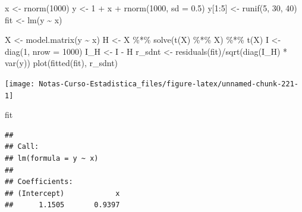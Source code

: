 \documentclass[
  12pt,
]{book}
\newenvironment{Shaded}{\begin{snugshade}}{\end{snugshade}}
\newcommand{\AttributeTok}[1]{\textcolor[rgb]{0.77,0.63,0.00}{#1}}
\newcommand{\DecValTok}[1]{\textcolor[rgb]{0.00,0.00,0.81}{#1}}
\newcommand{\FloatTok}[1]{\textcolor[rgb]{0.00,0.00,0.81}{#1}}
\newcommand{\FunctionTok}[1]{\textcolor[rgb]{0.00,0.00,0.00}{#1}}
\newcommand{\NormalTok}[1]{#1}
\newcommand{\OtherTok}[1]{\textcolor[rgb]{0.56,0.35,0.01}{#1}}
\newcommand{\SpecialCharTok}[1]{\textcolor[rgb]{0.00,0.00,0.00}{#1}}
\theoremstyle{definition}
\theoremstyle{definition}
\theoremstyle{definition}
\theoremstyle{remark}
\begin{document}
\begin{Shaded}
\begin{Highlighting}[]
\NormalTok{x }\OtherTok{\textless{}{-}} \FunctionTok{rnorm}\NormalTok{(}\DecValTok{1000}\NormalTok{)}
\NormalTok{y }\OtherTok{\textless{}{-}} \DecValTok{1} \SpecialCharTok{+}\NormalTok{ x }\SpecialCharTok{+} \FunctionTok{rnorm}\NormalTok{(}\DecValTok{1000}\NormalTok{, }\AttributeTok{sd =} \FloatTok{0.5}\NormalTok{)}
\NormalTok{y[}\DecValTok{1}\SpecialCharTok{:}\DecValTok{5}\NormalTok{] }\OtherTok{\textless{}{-}} \FunctionTok{runif}\NormalTok{(}\DecValTok{5}\NormalTok{, }\DecValTok{30}\NormalTok{, }\DecValTok{40}\NormalTok{)}
\NormalTok{fit }\OtherTok{\textless{}{-}} \FunctionTok{lm}\NormalTok{(y }\SpecialCharTok{\textasciitilde{}}\NormalTok{ x)}

\NormalTok{X }\OtherTok{\textless{}{-}} \FunctionTok{model.matrix}\NormalTok{(y }\SpecialCharTok{\textasciitilde{}}\NormalTok{ x)}
\NormalTok{H }\OtherTok{\textless{}{-}}\NormalTok{ X }\SpecialCharTok{\%*\%} \FunctionTok{solve}\NormalTok{(}\FunctionTok{t}\NormalTok{(X) }\SpecialCharTok{\%*\%}\NormalTok{ X) }\SpecialCharTok{\%*\%} \FunctionTok{t}\NormalTok{(X)}
\NormalTok{I }\OtherTok{\textless{}{-}} \FunctionTok{diag}\NormalTok{(}\DecValTok{1}\NormalTok{, }\AttributeTok{nrow =} \DecValTok{1000}\NormalTok{)}
\NormalTok{I\_H }\OtherTok{\textless{}{-}}\NormalTok{ I }\SpecialCharTok{{-}}\NormalTok{ H}
\NormalTok{r\_sdnt }\OtherTok{\textless{}{-}} \FunctionTok{residuals}\NormalTok{(fit)}\SpecialCharTok{/}\FunctionTok{sqrt}\NormalTok{(}\FunctionTok{diag}\NormalTok{(I\_H) }\SpecialCharTok{*} \FunctionTok{var}\NormalTok{(y))}
\FunctionTok{plot}\NormalTok{(}\FunctionTok{fitted}\NormalTok{(fit), r\_sdnt)}
\end{Highlighting}
\end{Shaded}

\begin{center}\texttt{[image: Notas-Curso-Estadistica\_files/figure-latex/unnamed-chunk-221-1]} \end{center}

\begin{Shaded}
\begin{Highlighting}[]
\NormalTok{fit}
\end{Highlighting}
\end{Shaded}

\begin{verbatim}
## 
## Call:
## lm(formula = y ~ x)
## 
## Coefficients:
## (Intercept)            x  
##      1.1505       0.9397
\end{verbatim}
\end{document}
